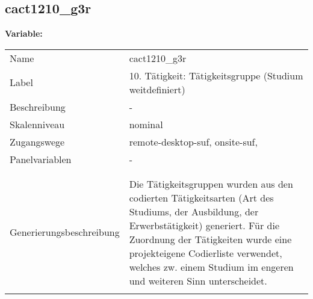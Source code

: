 	
	
	\subsection{cact1210\_g3r}
	\label{subSection:cact1210_g3r}

	\noindent\textbf{Variable:}\\
		\begin{tabular}{lL{11.3cm}}
			\label{tableVariable:cact1210_g3r}
			Name & cact1210\_g3r \\
			Label & 10. Tätigkeit: Tätigkeitsgruppe (Studium weitdefiniert) \\
			Beschreibung & - \\
			Skalenniveau & nominal \\
			Zugangswege &
				remote-desktop-suf,
				onsite-suf,
 \\
			Panelvariablen & -
			 \\
			 \\
 \\
					Generierungsbeschreibung & Die Tätigkeitsgruppen wurden aus den codierten Tätigkeitsarten (Art des Studiums, der Ausbildung, der Erwerbstätigkeit) generiert. Für die Zuordnung der Tätigkeiten wurde eine projekteigene Codierliste verwendet, welches zw. einem Studium im engeren und weiteren Sinn unterscheidet.
				 \\	
			 \\
		\end{tabular}







